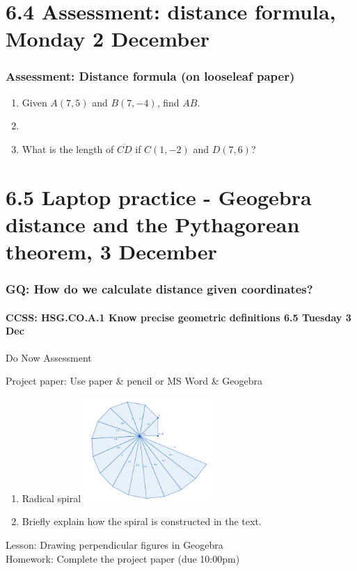 \documentclass{beamer}
\begin{document}
  \section{6.4 Assessment: distance formula, Monday 2 December}
  \frame
  {
    \frametitle{Assessment: Distance formula (on looseleaf paper)}
    \begin{enumerate}
      \item Given $A(7,5)$ and $B(7,-4)$, find $AB$. \hspace{0.5cm}
        \vspace{0.5cm}
      \item 
      \item What is the length of $\overline{CD}$ if $C(1,-2)$ and $D(7,6)$?
    \end{enumerate}
  }

  \section{6.5 Laptop practice - Geogebra distance and the Pythagorean theorem, 3 December}
  \frame
  {
  \frametitle{GQ: How do we calculate distance given coordinates?}
  \framesubtitle{CCSS: HSG.CO.A.1 Know precise geometric definitions \hfill \alert{6.5 Tuesday 3 Dec}}
  
  Do Now Assessment
  \begin{block}{Project paper: Use paper \& pencil or MS Word \& Geogebra}
  \begin{enumerate}
    \item Radical spiral
    \includegraphics[width=5cm]{6-5CW_Radical-spiral.png}
    \item Briefly explain how the spiral is constructed in the text.
  \end{enumerate}
  \end{block}
  Lesson: Drawing perpendicular figures in Geogebra\\[0.25cm]
  Homework: Complete the project paper (due 10:00pm)
  }
\end{document}
